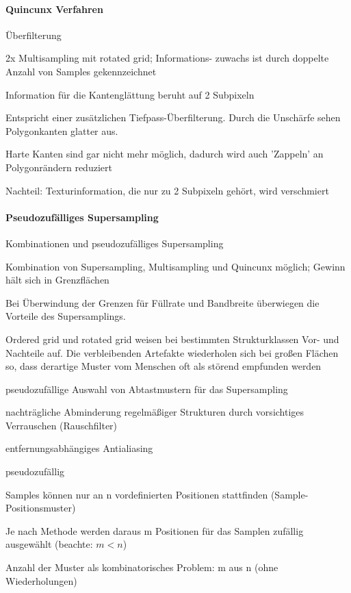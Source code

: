 \documentclass[landscape]{article}
\begin{document}
\begin{multicols}{3}
  \paragraph{Quincunx Verfahren}
  \begin{itemize*}
    \item Überfilterung
    \item 2x Multisampling mit rotated grid; Informations- zuwachs ist durch doppelte Anzahl von Samples gekennzeichnet
    \item Information für die Kantenglättung beruht auf 2 Subpixeln
    \item Entspricht einer zusätzlichen Tiefpass-Überfilterung. Durch die Unschärfe sehen Polygonkanten glatter aus.
    \item Harte Kanten sind gar nicht mehr möglich, dadurch wird auch 'Zappeln' an Polygonrändern reduziert
    \item Nachteil: Texturinformation, die nur zu 2 Subpixeln gehört, wird verschmiert
  \end{itemize*}
  
  \paragraph{Pseudozufälliges Supersampling}
  \begin{itemize*}
    \item Kombinationen und pseudozufälliges Supersampling
    \begin{itemize*}
      \item Kombination von Supersampling, Multisampling und Quincunx möglich; Gewinn hält sich in Grenzflächen
      \item Bei Überwindung der Grenzen für Füllrate und Bandbreite überwiegen die Vorteile des Supersamplings.
      \item Ordered grid und rotated grid weisen bei bestimmten Strukturklassen Vor- und Nachteile auf. Die verbleibenden Artefakte wiederholen sich bei großen Flächen so, dass derartige Muster vom Menschen oft als störend empfunden werden
      \item pseudozufällige Auswahl von Abtastmustern für das Supersampling
      \item nachträgliche Abminderung regelmäßiger Strukturen durch vorsichtiges Verrauschen (Rauschfilter)
      \item entfernungsabhängiges Antialiasing
    \end{itemize*}
    \item pseudozufällig
    \begin{itemize*}
      \item Samples können nur an n vordefinierten Positionen stattfinden (Sample-Positionsmuster)
      \item Je nach Methode werden daraus m Positionen für das Samplen zufällig ausgewählt (beachte: $m < n$)
      \item Anzahl der Muster als kombinatorisches Problem: m aus n (ohne Wiederholungen)
    \end{itemize*}
  \end{itemize*}
  

\end{multicols}
\end{document}
